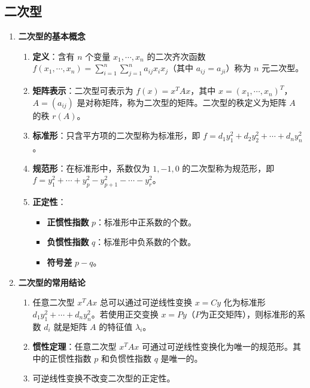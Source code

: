 \documentclass[UTF8]{ctexart}
\theoremstyle{mydef}
\begin{document}
\subsection{二次型}
\begin{enumerate}
    \item \textbf{二次型的基本概念}
    \begin{enumerate}
        \item \textbf{定义}：含有 $n$ 个变量 $x_1, \cdots, x_n$ 的二次齐次函数 $f(x_1, \cdots, x_n) = \sum_{i=1}^n \sum_{j=1}^n a_{ij} x_i x_j$（其中 $a_{ij}=a_{ji}$）称为 $n$ 元二次型。
        \item \textbf{矩阵表示}：二次型可表示为 $f(x) = x^T A x$，其中 $x=(x_1, \cdots, x_n)^T$，$A=(a_{ij})$ 是对称矩阵，称为二次型的矩阵。二次型的秩定义为矩阵 $A$ 的秩 $r(A)$。
        \item \textbf{标准形}：只含平方项的二次型称为标准形，即 $f = d_1 y_1^2 + d_2 y_2^2 + \cdots + d_n y_n^2$。
        \item \textbf{规范形}：在标准形中，系数仅为 $1, -1, 0$ 的二次型称为规范形，即 $f = y_1^2 + \cdots + y_p^2 - y_{p+1}^2 - \cdots - y_r^2$。
        \item \textbf{正定性}：
        \begin{itemize}
            \item \textbf{正惯性指数} $p$：标准形中正系数的个数。
            \item \textbf{负惯性指数} $q$：标准形中负系数的个数。
            \item \textbf{符号差} $p-q$。
        \end{itemize}
    \end{enumerate}
    \item \textbf{二次型的常用结论}
    \begin{enumerate}
        \item 任意二次型 $x^T A x$ 总可以通过可逆线性变换 $x=Cy$ 化为标准形 $d_1 y_1^2 + \cdots + d_n y_n^2$。若使用正交变换 $x=Py$（$P$为正交矩阵），则标准形的系数 $d_i$ 就是矩阵 $A$ 的特征值 $\lambda_i$。
        \item \textbf{惯性定理}：任意二次型 $x^T A x$ 可通过可逆线性变换化为唯一的规范形。其中的正惯性指数 $p$ 和负惯性指数 $q$ 是唯一的。
        \item 可逆线性变换不改变二次型的正定性。
    \end{enumerate}
\end{enumerate}
\end{document}
